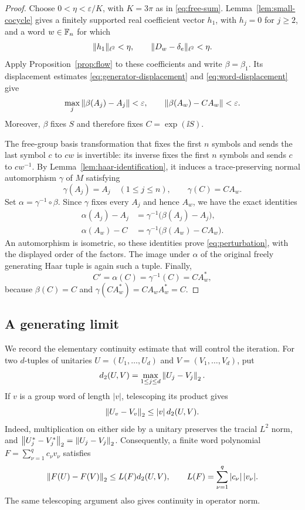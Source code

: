 \begin{proof}
Choose $0<\eta<\varepsilon/K$, with $K=3\pi$ as in
\eqref{eq:free-sum}.  Lemma~\ref{lem:small-cocycle} gives a finitely
supported real coefficient vector $h_1$, with $h_j=0$ for $j\geq2$,
and a word $w\in\mathbb F_n$ for which
\[
 \|h_1\|_{\ell^2}<\eta,
 \qquad
 \|D_w-\delta_e\|_{\ell^2}<\eta.
\]
Apply Proposition~\ref{prop:flow} to these coefficients and write
$\beta=\beta_1$.  Its displacement estimates
\eqref{eq:generator-displacement} and \eqref{eq:word-displacement}
give
\[
 \max_j\left\lVert \beta(A_j)-A_j\right\rVert<\varepsilon,
 \qquad
 \left\lVert \beta(A_w)-C A_w\right\rVert<\varepsilon.
\]
Moreover, $\beta$ fixes $S$ and therefore fixes $C=\exp(\ii S)$.

The free-group basis transformation that fixes the first $n$ symbols
and sends the last symbol $c$ to $c w$ is invertible: its inverse
fixes the first $n$ symbols and sends $c$ to $c w^{-1}$.  By
Lemma~\ref{lem:haar-identification}, it induces a trace-preserving
normal automorphism $\gamma$ of $M$ satisfying
\[
 \gamma(A_j)=A_j \quad(1\leq j\leq n),
 \qquad
 \gamma(C)=C A_w.
\]
Set $\alpha=\gamma^{-1}\circ\beta$.  Since $\gamma$ fixes every
$A_j$ and hence $A_w$, we have the exact identities
\begin{align*}
 \alpha(A_j)-A_j
   &=\gamma^{-1}\bigl(\beta(A_j)-A_j\bigr),\\
 \alpha(A_w)-C
   &=\gamma^{-1}\bigl(\beta(A_w)-C A_w\bigr).
\end{align*}
An automorphism is isometric, so these identities prove
\eqref{eq:perturbation}, with the displayed order of the factors.
The image under $\alpha$ of the original freely generating Haar
tuple is again such a tuple.  Finally,
\[
 C'=\alpha(C)=\gamma^{-1}(C)=C A_w^*,
\]
because $\beta(C)=C$ and
$\gamma(C A_w^*)=C A_w A_w^*=C$.
\end{proof}

\subsection{A generating limit}

We record the elementary continuity estimate that will control the
iteration.  For two $d$-tuples of unitaries $U=(U_1,\ldots,U_d)$ and
$V=(V_1,\ldots,V_d)$, put
\[
 d_2(U,V)=\max_{1\leq j\leq d}\left\lVert U_j-V_j\right\rVert_2.
\]
If $v$ is a group word of length $|v|$, telescoping its product gives
\[
 \left\lVert U_v-V_v\right\rVert_2\leq |v|\,d_2(U,V).
\]
Indeed, multiplication on either side by a unitary preserves the
tracial $L^2$ norm, and
$\left\lVert U_j^*-V_j^*\right\rVert_2=\left\lVert U_j-V_j\right\rVert_2$.
Consequently, a finite word polynomial
$F=\sum_{\nu=1}^q c_\nu v_\nu$ satisfies
\begin{equation}
\label{eq:word-polynomial-lipschitz}
 \left\lVert F(U)-F(V)\right\rVert_2
 \leq L(F)d_2(U,V),
 \qquad
 L(F)=\sum_{\nu=1}^q |c_\nu|\,|v_\nu|.
\end{equation}
The same telescoping argument also gives continuity in operator norm.

